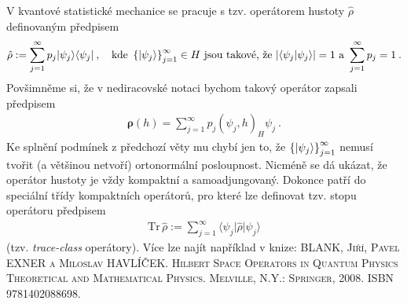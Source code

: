 \begin{remark}
V kvantové statistické mechanice se pracuje s tzv. operátorem hustoty $\hat{\rho}$ definovaným předpisem \begin{align*}
    \hat{\rho} := \sum_{j=1}^\infty p_j \lvert \psi_j \rangle \langle \psi_j \rvert \:, \quad \text{kde } \left \lbrace \lvert \psi_j \rangle \right \rbrace_{j=1}^\infty \in H \text{ jsou takové, že } |\langle \psi_j \lvert \psi_j \rangle |=1 \text{ a } \sum_{j=1}^\infty p_j =1 \:.
\end{align*}
Povšimněme si, že v nediracovské notaci bychom takový operátor zapsali předpisem \begin{align*}
    \boldsymbol \rho (h) = \sum_{j=1}^\infty p_j (\psi_j,h)_H \psi_j \:.
\end{align*}
Ke splnění podmínek z předchozí věty mu chybí jen to, že $\left \lbrace \lvert \psi_j \rangle \right \rbrace_{j=1}^\infty$ nemusí tvořit (a většinou netvoří) ortonormální posloupnost. Nicméně se dá ukázat, že operátor hustoty je vždy kompaktní a samoadjungovaný. Dokonce patří do speciální třídy kompaktních operátorů, pro které lze definovat tzv. stopu operátoru předpisem \begin{align*}
    \mathrm{Tr}\, \hat \rho := \sum_{j=1}^\infty \langle \psi_j \rvert \hat \rho \lvert \psi_j \rangle
\end{align*}
(tzv. \textit{trace-class} operátory).
Více lze najít například v knize: \textsc{BLANK, Jiří, Pavel EXNER a Miloslav HAVLÍČEK. Hilbert Space Operators in Quantum Physics Theoretical and Mathematical Physics. Melville, N.Y.: Springer, 2008. ISBN 9781402088698.}

\end{remark}

\pagebreak